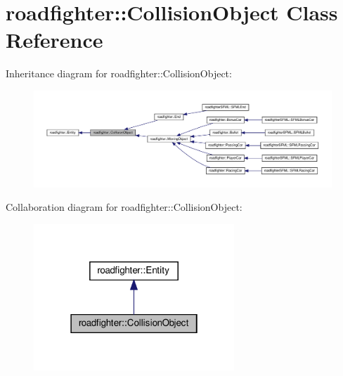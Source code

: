 \hypertarget{classroadfighter_1_1CollisionObject}{}\section{roadfighter\+:\+:Collision\+Object Class Reference}
\label{classroadfighter_1_1CollisionObject}


Inheritance diagram for roadfighter\+:\+:Collision\+Object\+:
\nopagebreak
\begin{figure}[H]
\begin{center}
\leavevmode
\includegraphics[width=350pt]{classroadfighter_1_1CollisionObject__inherit__graph}
\end{center}
\end{figure}


Collaboration diagram for roadfighter\+:\+:Collision\+Object\+:\nopagebreak
\begin{figure}[H]
\begin{center}
\leavevmode
\includegraphics[width=214pt]{classroadfighter_1_1CollisionObject__coll__graph}
\end{center}
\end{figure}
